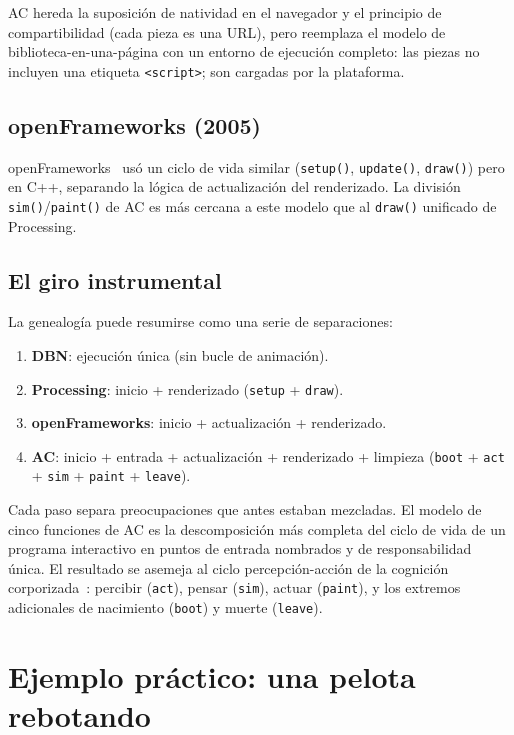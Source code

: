\documentclass[10pt,letterpaper,twocolumn]{article}
\begin{document}
AC hereda la suposición de natividad en el navegador y el principio de compartibilidad (cada pieza es una URL), pero reemplaza el modelo de biblioteca-en-una-página con un entorno de ejecución completo: las piezas no incluyen una etiqueta \texttt{<script>}; son cargadas por la plataforma.

\subsection{openFrameworks (2005)}

openFrameworks~\citep{openframeworks2005} usó un ciclo de vida similar (\texttt{setup()}, \texttt{update()}, \texttt{draw()}) pero en C++, separando la lógica de actualización del renderizado. La división \texttt{sim()}/\texttt{paint()} de AC es más cercana a este modelo que al \texttt{draw()} unificado de Processing.

\subsection{El giro instrumental}

La genealogía puede resumirse como una serie de separaciones:

\begin{enumerate}
  \item \textbf{DBN}: ejecución única (sin bucle de animación).
  \item \textbf{Processing}: inicio + renderizado (\texttt{setup} + \texttt{draw}).
  \item \textbf{openFrameworks}: inicio + actualización + renderizado.
  \item \textbf{AC}: inicio + entrada + actualización + renderizado + limpieza (\texttt{boot} + \texttt{act} + \texttt{sim} + \texttt{paint} + \texttt{leave}).
\end{enumerate}

Cada paso separa preocupaciones que antes estaban mezcladas. El modelo de cinco funciones de AC es la descomposición más completa del ciclo de vida de un programa interactivo en puntos de entrada nombrados y de responsabilidad única. El resultado se asemeja al ciclo percepción-acción de la cognición corporizada~\citep{varela1991embodied}: percibir (\texttt{act}), pensar (\texttt{sim}), actuar (\texttt{paint}), y los extremos adicionales de nacimiento (\texttt{boot}) y muerte (\texttt{leave}).


\section{Ejemplo práctico: una pelota rebotando}
\label{sec:example}
\end{document}
